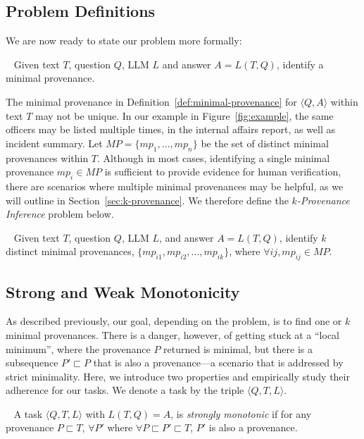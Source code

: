 \subsection{Problem Definitions}
\label{subsec:problem-def} 

We are now ready to state our problem more formally:
\begin{problem}
    ~\label{def:1-provenance} 
    Given text $T$, question $Q$, LLM $L$ and answer $A=L(T,Q)$, identify a minimal provenance. 
\end{problem}

\noindent The minimal provenance  
in Definition~\ref{def:minimal-provenance} for $\langle Q, A \rangle$ 
within text $T$ may not be unique. 
In our example in Figure~\ref{fig:example}, 
the same officers may be listed multiple times, in the internal affairs report, 
 as well as incident summary. 
Let $MP = \{mp_1, \dots, mp_n\}$ be the set of distinct minimal provenances within $T$.  
Although in most cases, identifying a single minimal provenance $mp_i \in MP$
is sufficient to provide evidence for human verification,
there are scenarios where multiple minimal provenances
may be helpful, as we will outline in Section~\ref{sec:k-provenance}.
We therefore define the {\em $k$-Provenance Inference} problem below. 
\begin{problem}
    ~\label{def:k-provenance} Given text $T$, question $Q$, LLM $L$, and answer $A = L(T,Q)$, identify $k$ distinct minimal provenances,  $\{mp_{i1},mp_{i2},...,mp_{ik}\}$, where $\forall ij, mp_{ij} \in MP$. 
\end{problem}




\vspace{-2mm}
\subsection{Strong and Weak Monotonicity}\label{subsec:strong-weak}
As described previously, our goal, depending on the problem,
is to find one or $k$ minimal provenances.
There is a danger, however, of getting stuck 
at a ``local minimum'', where the provenance $P$ returned is minimal,
but there is a subsequence $P' \sqsubset P$ that is also a provenance---a scenario 
that is addressed by strict minimality.
Here, we introduce two properties and empirically study 
their adherence for our tasks.
We denote a task by the triple $\langle Q,T,L\rangle$.
\begin{definition}
    ~\label{def:strong-mono} A task $\langle Q,T,L\rangle$ with $L(T, Q) = A$, is  {\em strongly monotonic} if for any provenance $P\sqsubset T$, $\forall P'$ where $\forall P\sqsubset P' \sqsubset T$, $P'$ is also a provenance. 
\end{definition}


